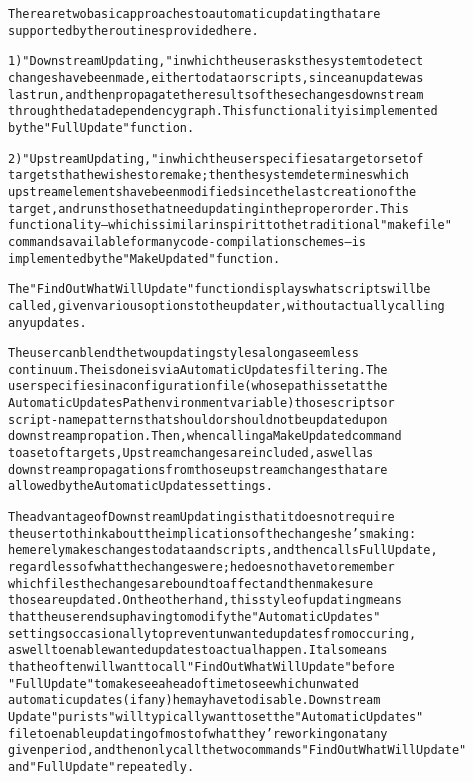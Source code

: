\begin{alltt}
There are two basic approaches to automatic updating that are 
supported by the routines provided here.

1) "Downstream Updating," in which the user asks the system to detect 
changes have been made, either to data or scripts, since an update was 
last run, and then propagate the results of these changes downstream 
through the data dependency graph.  This functionality is implemented
by the "FullUpdate" function. 
        
2) "Upstream Updating," in which the user specifies a target or set of
targets that he wishes to remake; then the system determines which 
upstream elements have been modified since the last creation of the 
target, and runs those that need updating in the proper order.  This 
functionality -- which is similar in spirit to the traditional "makefile" 
commands available for many code-compilation schemes -- is
implemented by the "MakeUpdated" function. 

The "FindOutWhatWillUpdate" function displays what scripts will be 
called, given various options to the updater, without actually calling
any updates. 

The user can blend the two updating styles along a seemless
continuum.  The is done is via Automatic Updates filtering.  The 
user specifies in a configuration file (whose path is set at the 
AutomaticUpdatesPath environment variable) those scripts or 
script-name patterns that should or should not be updated upon
downstream propation.  Then, when calling a MakeUpdated command
to a set of targets, Upstream changes are included, as well as 
downstream propagations from those upstream changes that are 
allowed by the Automatic Updates settings.   

The advantage of Downstream Updating is that it does not require 
the user to think about the implications of the changes he's making: 
he merely makes changes to data and scripts, and then calls FullUpdate,
regardless of what the changes were; he does not have to remember 
which files the changes are bound to affect and then make sure 
those are updated.  On the other hand, this style of updating means 
that the user ends up having to modify the "Automatic Updates" 
settings occasionally to prevent unwanted updates from occuring, 
as well to enable wanted updates to actual happen.  It also means 
that he often will want to call "FindOutWhatWillUpdate" before 
"FullUpdate" to make see ahead of time to see which unwated
automatic updates (if any) he may have to disable.    Downstream
Update "purists" will typically want to set the "Automatic Updates"
file to enable updating of most of what they're working on at any
given period, and then only call the two commands "FindOutWhatWillUpdate"
and "FullUpdate" repeatedly. 


\end{alltt}
